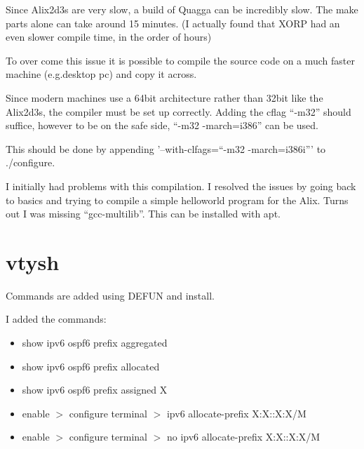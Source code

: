 Since Alix2d3s are very slow, a build of Quagga can be incredibly slow. The make parts
alone can take around 15 minutes. (I actually found that XORP had an even slower
compile time, in the order of hours) 

To over come this issue it is possible to compile the source code on a much
faster machine (e.g.\@ desktop pc) and copy it across. 

Since modern machines use a 64bit architecture rather than 32bit like the
Alix2d3s, the compiler must be set up correctly. Adding the cflag ``-m32'' should
suffice, however to be on the safe side, ``-m32 -march=i386'' can be used. 

This should be done by appending '--with-clfags=``-m32 -march=i386i''' to \@./configure.

I initially had problems with this compilation. I resolved the issues by going
back to basics and trying to compile a simple helloworld program for the Alix.
Turns out I was missing ``gcc-multilib''. This can be installed with apt.

\chapter{vtysh}
\label{vtysh}

Commands are added using DEFUN and install.

I added the commands:
\begin{itemize}
  \item show ipv6 ospf6 prefix aggregated
  \item show ipv6 ospf6 prefix allocated 
  \item show ipv6 ospf6 prefix assigned X

  \item enable $>$ configure terminal $>$ ipv6 allocate-prefix X:X::X:X/M
  \item enable $>$ configure terminal $>$ no ipv6 allocate-prefix X:X::X:X/M
\end{itemize}
